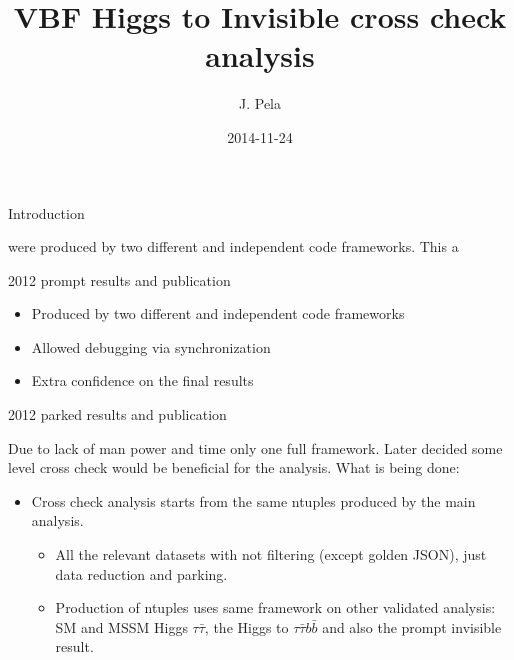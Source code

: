 \documentclass[8pt]{beamer}
\author[J. Pela]{J. Pela}
\title{VBF Higgs to Invisible cross check analysis}
\institute[ICL]{Imperial College London}
\date{2014-11-24}
\begin{document}
\setlength{\unitlength}{1mm}

\newcommand*\rot{\rotatebox{90}}

\begin{frame}
  \titlepage
\end{frame}

\begin{frame}{Introduction}

 were produced by two different and independent code frameworks. This a

\begin{block}{2012 prompt results and publication}
 
 \begin{itemize}
  \item Produced by two different and independent code frameworks
  \item Allowed debugging via synchronization
  \item Extra confidence on the final results
 \end{itemize}

\end{block}

\begin{block}{2012 parked results and publication}
 
  Due to lack of man power and time only one full framework. Later decided some level cross check would be beneficial for the analysis. What is being done:
 
 \begin{itemize}
  \item Cross check analysis starts from the same ntuples produced by the main analysis.
  \begin{itemize}
    \item All the relevant datasets with not filtering (except golden JSON), just data reduction and parking.
    \item Production of ntuples uses same framework on other validated analysis: SM and MSSM Higgs $\tau\bar{\tau}$, the Higgs to $\tau\bar{\tau}b\bar{b}$ and also the prompt invisible result.
  \end{itemize}
  
 \end{itemize}
 
\end{block}

\end{frame}
\end{document}

